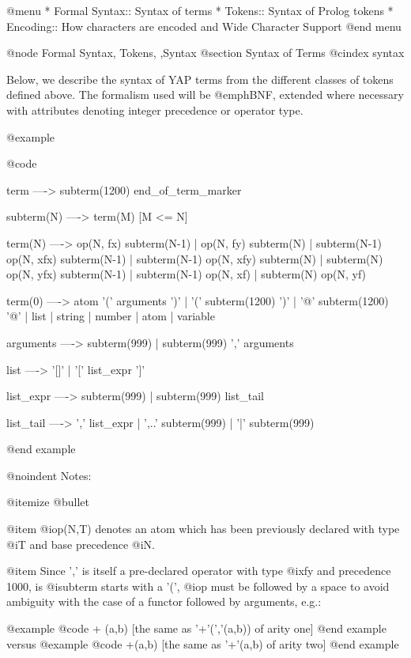 {@menu
* Formal Syntax:: Syntax of terms 
* Tokens:: Syntax of Prolog tokens
* Encoding:: How characters are encoded and Wide Character Support
@end menu

@node Formal Syntax, Tokens, ,Syntax
@section Syntax of Terms
@cindex syntax

Below, we describe the syntax of YAP terms from the different
classes of tokens defined above. The formalism used will be @emph{BNF},
extended where necessary with attributes denoting integer precedence or
operator type.

@example

@code{
 term       ---->     subterm(1200)   end_of_term_marker

 subterm(N) ---->     term(M)         [M <= N]

 term(N)    ---->     op(N, fx) subterm(N-1)
             |        op(N, fy) subterm(N)
             |        subterm(N-1) op(N, xfx) subterm(N-1)
             |        subterm(N-1) op(N, xfy) subterm(N)
             |        subterm(N) op(N, yfx) subterm(N-1)
             |        subterm(N-1) op(N, xf)
             |        subterm(N) op(N, yf)

 term(0)   ---->      atom '(' arguments ')'
             |        '(' subterm(1200)  ')'
             |        '@{' subterm(1200)  '@}'
             |        list
             |        string
             |        number
             |        atom
             |        variable

 arguments ---->      subterm(999)
             |        subterm(999) ',' arguments

 list      ---->      '[]'
             |        '[' list_expr ']'

 list_expr ---->      subterm(999)
             |        subterm(999) list_tail

 list_tail ---->      ',' list_expr
             |        ',..' subterm(999)
             |        '|' subterm(999)
}
@end example

@noindent
Notes:

@itemize @bullet

@item
@i{op(N,T)} denotes an atom which has been previously declared with type
@i{T} and base precedence @i{N}.

@item
Since ',' is itself a pre-declared operator with type @i{xfy} and
precedence 1000, is @i{subterm} starts with a '(', @i{op} must be
followed by a space to avoid ambiguity with the case of a functor
followed by arguments, e.g.:

@example
@code{ + (a,b)        [the same as '+'(','(a,b)) of arity one]}
@end example
versus
@example
@code{ +(a,b)         [the same as '+'(a,b) of arity two]}
@end example

}
